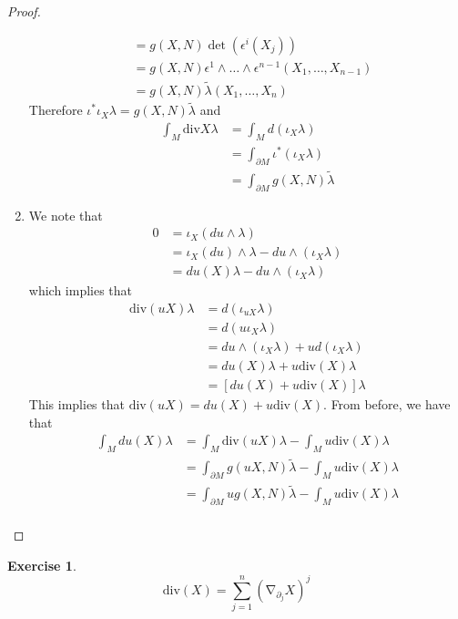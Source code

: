 \documentclass{book}
\theoremstyle{definition}
\newtheorem{ex}[definition]{Exercise}
\newcommand{\ep}{\epsilon}
\newcommand{\lam}{\lambda}
\DeclareMathOperator{\nab}{\nabla}
\DeclareMathOperator*{\0}{\mbf{0}}
\DeclareMathOperator*{\1}{\mbf{1}}
\renewcommand{\div}{\text{div}}
\newcommand{\p}{\partial}
\begin{document}
\begin{proof}
\begin{enumerate}
\begin{align*}
			& = g(X, N) \det (\ep^i(X_j)) \\
			& = g(X,N) \ep^1 \wedge \ldots \wedge \ep^{n-1}(X_1, \ldots, X_{n-1}) \\
			& =  g(X, N) \tilde{\lam}(X_1, \ldots, X_n) 
		\end{align*}
		Therefore $	\iota^* \iota_X \lam  = g(X,N) \tilde{\lam}$ and 
		\begin{align*}
			\int_M \div X \lam 
			& = \int_M d(\iota_X \lam) \\
			& = \int_{\p M} \iota^* (\iota_X \lam) \\
			& = \int_{\p M} g(X, N) \tilde{\lam}
		\end{align*}
		\item We note that
		\begin{align*}
			0
			& = \iota_X(d u \wedge \lam) \\
			& = \iota_X(du) \wedge \lam - du \wedge (\iota_X \lam) \\
			& = du(X) \lam  - du \wedge (\iota_X \lam) 
		\end{align*} 
		which implies that 
		\begin{align*}
			\div (uX) \lam 
			& = d(\iota_{uX} \lam) \\
			& = d (u \iota_X \lam) \\
			& = du \wedge (\iota_X \lam) + u d(\iota_X \lam ) \\
			& = du(X) \lam + u \div(X) \lam \\
			& = [du(X) + u \div(X)] \lam 
		\end{align*}
		This implies that $	\div (uX) = du(X) + u \div(X)$. From before, we have that 
		\begin{align*}
			\int_M du(X) \lam 
			& = \int_M \div (uX) \lam - \int_M u \div(X) \lam \\
			& = \int_{\p M} g(uX, N) \tilde{\lam} - \int_M u \div(X) \lam \\
			& = \int_{\p M} u g(X, N) \tilde{\lam} - \int_M u \div(X) \lam \\
		\end{align*}
	\end{enumerate}
\end{proof}


\begin{ex}
	$$\div(X) = \sum_{j = 1}^n (\nab_{\p_j} X)^j$$
\end{ex}
\end{document}
